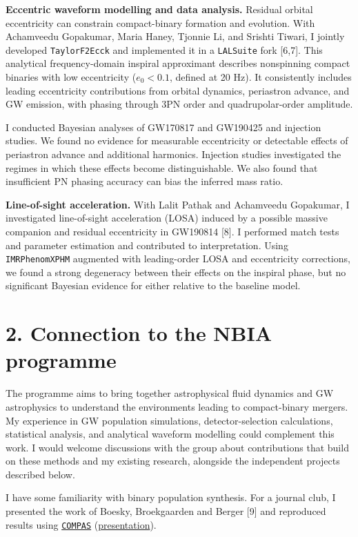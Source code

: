 \documentclass[11pt]{article}
\begin{document}
\textbf{Eccentric waveform modelling and data analysis.} Residual orbital eccentricity can constrain compact-binary formation and evolution. With Achamveedu Gopakumar, Maria Haney, Tjonnie Li, and Srishti Tiwari, I jointly developed \texttt{TaylorF2Ecck} and implemented it in a \texttt{LALSuite} fork [6,7]. This analytical frequency-domain inspiral approximant describes nonspinning compact binaries with low eccentricity ($e_0<0.1$, defined at 20 Hz). It consistently includes leading eccentricity contributions from orbital dynamics, periastron advance, and GW emission, with phasing through 3PN order and quadrupolar-order amplitude.

I conducted Bayesian analyses of GW170817 and GW190425 and injection studies. We found no evidence for measurable eccentricity or detectable effects of periastron advance and additional harmonics. Injection studies investigated the regimes in which these effects become distinguishable. We also found that insufficient PN phasing accuracy can bias the inferred mass ratio.

\textbf{Line-of-sight acceleration.} With Lalit Pathak and Achamveedu Gopakumar, I investigated line-of-sight acceleration (LOSA) induced by a possible massive companion and residual eccentricity in GW190814 [8]. I performed match tests and parameter estimation and contributed to interpretation. Using \texttt{IMRPhenomXPHM} augmented with leading-order LOSA and eccentricity corrections, we found a strong degeneracy between their effects on the inspiral phase, but no significant Bayesian evidence for either relative to the baseline model.

\section*{2. Connection to the NBIA programme}
The programme aims to bring together astrophysical fluid dynamics and GW astrophysics to understand the environments leading to compact-binary mergers. My experience in GW population simulations, detector-selection calculations, statistical analysis, and analytical waveform modelling could complement this work. I would welcome discussions with the group about contributions that build on these methods and my existing research, alongside the independent projects described below.

I have some familiarity with binary population synthesis. For a journal club, I presented the work of Boesky, Broekgaarden and Berger [9] and reproduced results using \href{https://compas.science/}{\texttt{COMPAS}} (\href{https://docs.google.com/presentation/d/1WBn-nu949xdn9oGZe1GgIlbHsQ_ZBelahJA6aSFyVq0/edit}{presentation}).
\end{document}

